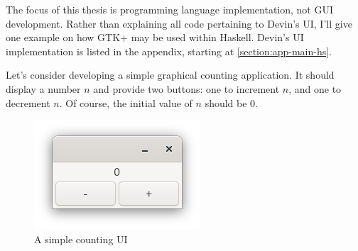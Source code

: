 \documentclass[UdineBachThesis,american,11pt]{PhdThesis}
\begin{document}
  The focus of this thesis is programming language implementation, not GUI
  development. Rather than explaining all code pertaining to Devin's UI, I'll
  give one example on how GTK+ may be used within Haskell. Devin's UI
  implementation is listed in the appendix, starting at
  \autoref{section:app-main-hs}.

  Let's consider developing a simple graphical counting application. It should
  display a number $n$ and provide two buttons: one to increment $n$, and one to
  decrement $n$. Of course, the initial value of $n$ should be $0$.

  \begin{figure}[h]
    \centering
    \includegraphics[scale=0.8]{7.png}
    \caption{A simple counting UI}
  \end{figure}
\end{document}
